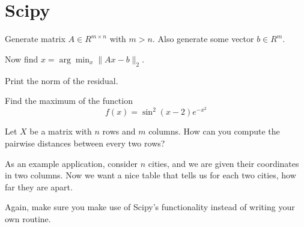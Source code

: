 \section{Scipy} %
\label{sec:scipy}
\begin{questions}
\label{sub:least_squares}

Generate matrix $A \in R^{m \times n}$ with $m > n$.
Also generate some vector $b \in R^m$.

Now find $x = \arg\min_x \|Ax-b\|_2$.

Print the norm of the residual.


\label{sub:optimization}

Find the maximum of the function
\[
    f(x) = \sin^2(x-2)e^{-x^2}
\]



\label{sub:pairwise_dists}

Let $X$ be a matrix with $n$ rows and $m$ columns.
How can you compute the pairwise distances between every two rows?

As an example application, consider $n$ cities, and we are given their coordinates
in two columns.
Now we want a nice table that tells us for each two cities, how far they
are apart.

Again, make sure you make use of Scipy's functionality instead of writing your own routine.


\end{questions}

